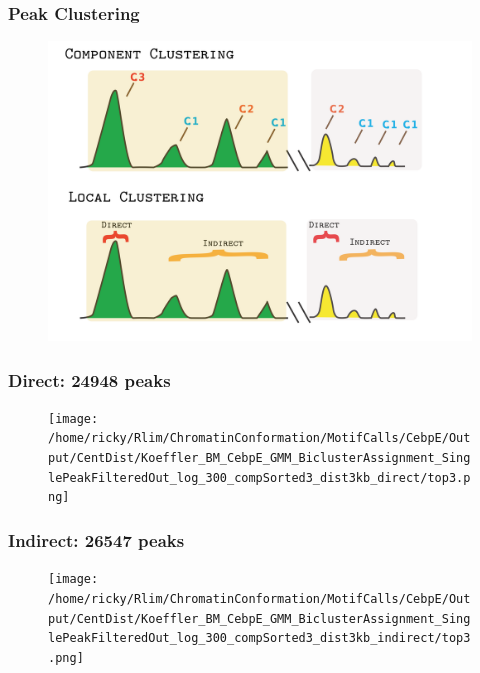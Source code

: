 \documentclass[notes]{beamer}
\begin{document}
\begin{frame}[plain]
    \frametitle{Peak Clustering}
    \begin{figure}
        \includegraphics[width=1\textwidth, height=0.6\textwidth]{../Images/LocalClustering.png}
    \end{figure}
\end{frame}

\begin{frame}[plain]
    \frametitle{Direct: 24948 peaks}
    \begin{figure}
        \texttt{[image: /home/ricky/Rlim/ChromatinConformation/MotifCalls/CebpE/Output/CentDist/Koeffler\_BM\_CebpE\_GMM\_BiclusterAssignment\_SinglePeakFilteredOut\_log\_300\_compSorted3\_dist3kb\_direct/top3.png]}
    \end{figure}
\end{frame}

\begin{frame}[plain]
    \frametitle{Indirect: 26547 peaks}
    \begin{figure}
        \texttt{[image: /home/ricky/Rlim/ChromatinConformation/MotifCalls/CebpE/Output/CentDist/Koeffler\_BM\_CebpE\_GMM\_BiclusterAssignment\_SinglePeakFilteredOut\_log\_300\_compSorted3\_dist3kb\_indirect/top3.png]}
    \end{figure}
\end{frame}


\begin{frame}

\end{frame}
\end{document}

